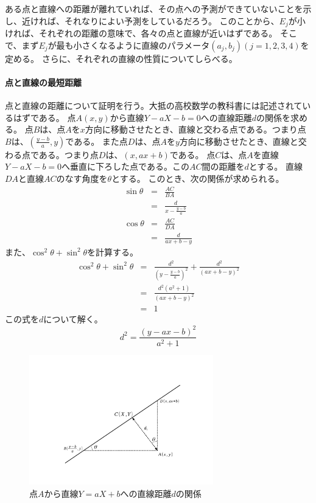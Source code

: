 ある点と直線への距離が離れていれば、その点への予測ができていないことを示し、近ければ、それなりによい予測をしているだろう。
このことから、$E_j$が小ければ、それぞれの距離の意味で、各々の点と直線が近いはずである。
そこで、まず$E_j$が最も小さくなるように直線のパラメータ$(a_j,b_j)(j=1,2,3,4)$を定める。
さらに、それぞれの直線の性質についてしらべる。


\paragraph{点と直線の最短距離}
点と直線の距離について証明を行う。大抵の高校数学の教科書には記述されているはずである。
点$A(x,y)$から直線$Y-aX-b=0$への直線距離$d$の関係を求める。
点$B$は、点$A$を$x$方向に移動させたとき、直線と交わる点である。つまり点$B$は、$(\frac{y-b}{a},y)$である。
また点$D$は、点$A$を$y$方向に移動させたとき、直線と交わる点である。つまり点$D$は、$(x,ax+b)$である。
点$C$は、点$A$を直線$Y-aX-b=0$へ垂直に下ろした点である。この$AC$間の距離を$d$とする。
直線$DA$と直線$AC$のなす角度を$\theta$とする。
このとき、次の関係が求められる。
\begin{eqnarray*}
 \sin \theta &=& \frac{AC}{BA}\\
 &=& \frac{d}{x-\frac{y-b}{a}}\\
\cos\theta &=& \frac{AC}{DA}\\
&=& \frac{d}{ax+b-y}
\end{eqnarray*}
また、$\cos^2\theta+\sin^2\theta$を計算する。
\begin{eqnarray*}
 \cos^2\theta+\sin^2\theta &=& \frac{d^2}{(y - \frac{y-b}{a})^2}+\frac{d^2}{(ax+b-y)^2}\\
 &=& \frac{d^2(a^2+1)}{(ax+b-y)^2} \\
 &=& 1
\end{eqnarray*}
この式を$d$について解く。
\begin{equation*}
 d^2 = \frac{(y-ax-b)^2}{a^2+1}
\end{equation*}


\begin{figure}
 \begin{center}
  \includegraphics[width=8cm]{./image/16_/point_line_distance.pdf}
  \caption{点$A$から直線$Y=aX+b$への直線距離$d$の関係}
  \label{fig:point_line_distance}
 \end{center}
\end{figure}

